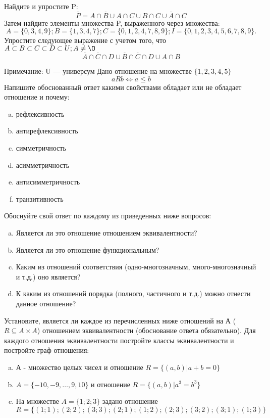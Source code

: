 \documentclass[10pt]{exam}
\begin{document}
\begin{questions}
\question
Найдите и упростите P:
\begin{equation*}
\overline{P} = A \cap \overline{B} \cup A \cap C \cup B \cap C \cup \overline{A} \cap C
\end{equation*}
Затем найдите элементы множества P, выраженного через множества:
\begin{equation*}
A = \{0, 3, 4, 9\}; 
B = \{1, 3, 4, 7\};
C = \{0, 1, 2, 4, 7, 8, 9\};
I = \{0, 1, 2, 3, 4, 5, 6, 7, 8, 9\}.
\end{equation*}\question
Упростите следующее выражение с учетом того, что $A\subset B \subset C \subset D \subset U; A \neq \O$
\begin{equation*}
\overline{A} \cap \overline{C} \cap D \cup \overline{B} \cap \overline{C} \cap D \cup A \cap B
\end{equation*}

Примечание: U — универсум\question
Дано отношение на множестве $\{1, 2, 3, 4, 5\}$ 
\begin{equation*}
aRb \iff a \leq b
\end{equation*}
Напишите обоснованный ответ какими свойствами обладает или не обладает отношение и почему:   
\begin{enumerate} [a)]\setcounter{enumi}{0}
\item рефлексивность
\item антирефлексивность
\item симметричность
\item асимметричность
\item антисимметричность
\item транзитивность
\end{enumerate}

Обоснуйте свой ответ по каждому из приведенных ниже вопросов:
\begin{enumerate} [a)]\setcounter{enumi}{0}
    \item Является ли это отношение отношением эквивалентности?
    \item Является ли это отношение функциональным?
    \item Каким из отношений соответствия (одно-многозначным, много-многозначный и т.д.) оно является?
    \item К каким из отношений порядка (полного, частичного и т.д.) можно отнести данное отношение?
\end{enumerate}


\question
Установите, является ли каждое из перечисленных ниже отношений на А ($R \subseteq A \times A$) отношением эквивалентности (обоснование ответа обязательно). Для каждого отношения эквивалентности 
постройте классы эквивалентности и постройте граф отношения:
\begin{enumerate}[a)]\setcounter{enumi}{0}
\item А - множество целых чисел и отношение $R = \{(a,b)|a + b = 0\}$
\item $A = \{-10, -9, …, 9, 10\}$ и отношение $R = \{(a,b)|a^{3} = b^{3}\}$
\item На множестве $A = \{1; 2; 3\}$ задано отношение $R = \{(1; 1); (2; 2); (3; 3); (2; 1); (1; 2); (2; 3); (3; 2); (3; 1); (1; 3)\}$


\end{enumerate}
\end{questions}
\end{document}
